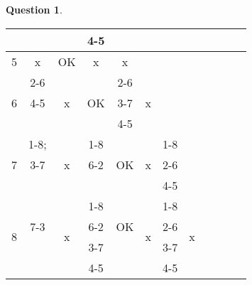 \documentclass[11pt,a4paper]{article}
\theoremstyle{definition}%
\newtheorem{Q}{Question}[] %
\begin{document}
\begin{Q}
{\begin{center}
\begin{tabular}{|c|c|c|c|c|c|c|c|c|c|c|c|}
				 & \cellcolor{red!25} & & \cellcolor{red!25}4-5 & \cellcolor{gray!20} & \cellcolor{gray!20} & \cellcolor{gray!20} & \cellcolor{gray!20} \\ \hline
				5 & x & \cellcolor{green!25}OK & x & x & \cellcolor{gray!20} & \cellcolor{gray!20} & \cellcolor{gray!20} \\ \hline
				\multirow{3}{*}{6} & \cellcolor{red!25}2-6 & \multirow{3}{*}{x} & \cellcolor{green!25} & \cellcolor{red!25}2-6 & \multirow{3}{*}{x} & \cellcolor{gray!20} &\cellcolor{gray!20} \\
				 & \cellcolor{red!25}4-5 &  & \cellcolor{green!25}OK & \cellcolor{red!25}3-7 &  & \cellcolor{gray!20} &  \cellcolor{gray!20}\\
				 & \cellcolor{red!25} &  & \cellcolor{green!25} & \cellcolor{red!25}4-5 &  & \cellcolor{gray!20} &  \cellcolor{gray!20}\\ \hline
				\multirow{3}{*}{7} & \cellcolor{red!25}1-8; & \multirow{3}{*}{x} & \cellcolor{red!25}1-8 & \cellcolor{green!25} & \multirow{3}{*}{x} & \cellcolor{red!25}1-8 & \cellcolor{gray!20} \\
				 & \cellcolor{red!25}3-7 &  & \cellcolor{red!25}6-2 & \cellcolor{green!25}OK &  & \cellcolor{red!25}2-6 & \cellcolor{gray!20} \\
				 & \cellcolor{red!25} & & \cellcolor{red!25} & \cellcolor{green!25} &  & \cellcolor{red!25}4-5 & \cellcolor{gray!20} \\ \hline
				\multirow{4}{*}{8} & \cellcolor{red!25} & \multirow{4}{*}{x} & \cellcolor{red!25}1-8  & \cellcolor{green!25}  & \multirow{4}{*}{x}  & \cellcolor{red!25}1-8 & \multirow{4}{*}{x} \\
				& \cellcolor{red!25}7-3 &  & \cellcolor{red!25}6-2 & \cellcolor{green!25}OK & & \cellcolor{red!25}2-6 & \\
				& \cellcolor{red!25} &  & \cellcolor{red!25}3-7 & \cellcolor{green!25} & & \cellcolor{red!25}3-7 & \\
				& \cellcolor{red!25} &  & \cellcolor{red!25}4-5 & \cellcolor{green!25} & & \cellcolor{red!25}4-5 & \\ \hline

\end{tabular}
\end{center}}
\end{Q}
\end{document}
